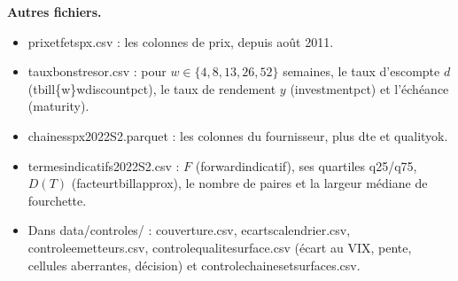\documentclass[10pt,a4paper]{article}
\newcommand{\coupure}{\textunderscore\allowbreak}
\newcommand{\fic}[1]{{\small\ttfamily\let\_\coupure #1}}
\begin{document}
\textbf{Autres fichiers.}
\begin{itemize}
\item \fic{prix\_etf\_et\_spx.csv} : les colonnes de prix, depuis août 2011.
\item \fic{taux\_bons\_tresor.csv} : pour $w\in\{4,8,13,26,52\}$ semaines, le taux d'escompte $d$ (\fic{tbill\_\{w\}w\_discount\_pct}), le taux de rendement $y$ (\fic{\_investment\_pct}) et l'échéance (\fic{\_maturity}).
\item \fic{chaines\_spx\_2022S2.parquet} : les colonnes du fournisseur, plus \fic{dte} et \fic{quality\_ok}.
\item \fic{termes\_indicatifs\_2022S2.csv} : $F$ (\fic{forward\_indicatif}), ses quartiles \fic{q25}/\fic{q75}, $D(T)$ (\fic{facteur\_tbill\_approx}), le nombre de paires et la largeur médiane de fourchette.
\item Dans \fic{data/controles/} : \fic{couverture.csv}, \fic{ecarts\_calendrier.csv}, \fic{controle\_emetteurs.csv}, \fic{controle\_qualite\_surface.csv} (écart au VIX, pente, cellules aberrantes, décision) et \fic{controle\_chaines\_et\_surfaces.csv}.
\end{itemize}

\end{document}
